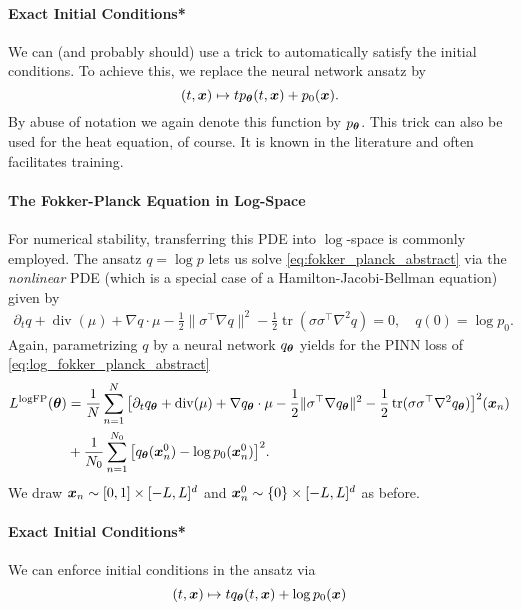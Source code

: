 \paragraph{Exact Initial Conditions*}
We can (and probably should) use a trick to automatically satisfy the initial conditions. To achieve this, we replace the neural network ansatz by 
\begin{equation}
    (t,{\bm{x}}) 
    \mapsto
    t p_{\bm{\theta}}(t,{\bm{x}}) + p_0({\bm{x}}).
\end{equation}
By abuse of notation we again denote this function by $p_{\bm{\theta}}$. This trick can also be used for the heat equation, of course. It is known in the literature and often facilitates training.

\paragraph{The Fokker-Planck Equation in Log-Space}
For numerical stability, transferring this PDE into $\log$-space is commonly employed. The ansatz $q = \log p$ lets us solve \eqref{eq:fokker_planck_abstract} via the \emph{nonlinear} PDE (which is a special case of a Hamilton-Jacobi-Bellman equation) given by
\begin{align}\label{eq:log_fokker_planck_abstract}
    \partial_t q
    +
    \operatorname{div}(\mu)
    +
    \nabla q \cdot \mu
    -
    \frac12 \| \sigma^\top \nabla q \|^2
    -
    \frac12 \operatorname{tr}(\sigma \sigma^\top\nabla^2 q)
    =
    0,
    \quad
    q(0) = \log p_0.
\end{align}
Again, parametrizing $q$ by a neural network $q_{\bm{\theta}}$ yields for the PINN loss of \eqref{eq:log_fokker_planck_abstract}
\begin{align*}
    L^{\textrm{logFP}}({\bm{\theta}})
    &=
    \frac{1}{N}
    \sum_{n=1}^{N}
    \big[
    \partial_t q_{{\bm{\theta}}}
    +
    \operatorname{div}(\mu)
    +
    \nabla q_{\bm{\theta}} \cdot \mu
    -
    \frac12 \| \sigma^\top\nabla q_{\bm{\theta}} \|^2
    -
    \frac12 \operatorname{tr}(\sigma\sigma^\top\nabla^2 q_{{\bm{\theta}}})
    \big]^2
    ({\bm{x}}_n)
    \\
    &+
    \frac{1}{N_0}
    \sum_{n=1}^{N_0}
    \big[
    q_{{\bm{\theta}}}({\bm{x}}_n^0) - \log p_0({\bm{x}}_n^0)
    \big]^2.
\end{align*}
We draw ${\bm{x}}_n \sim [0, 1] \times [-L, L]^d$ and ${\bm{x}}_n^0 \sim \{0\} \times [-L, L]^d$ as before.

\paragraph{Exact Initial Conditions*}
We can enforce initial conditions in the ansatz via 
\begin{equation*}
    (t,{\bm{x}}) \mapsto t q_{\bm{\theta}}(t, {\bm{x}}) + \log p_0({\bm{x}})
\end{equation*}

